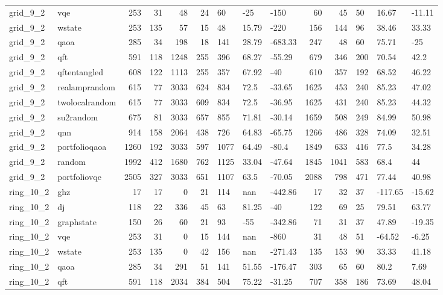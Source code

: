 \begin{longtable}{llrrrrlllrrlll}
grid\_9\_2 & vqe & 253 & 31 & 48 & 24 & 60 & -25 & -150 & 60 & 45 & 50 & 16.67 & -11.11 \\
grid\_9\_2 & wstate & 253 & 135 & 57 & 15 & 48 & 15.79 & -220 & 156 & 144 & 96 & 38.46 & 33.33 \\
grid\_9\_2 & qaoa & 285 & 34 & 198 & 18 & 141 & 28.79 & -683.33 & 247 & 48 & 60 & 75.71 & -25 \\
grid\_9\_2 & qft & 591 & 118 & 1248 & 255 & 396 & 68.27 & -55.29 & 679 & 346 & 200 & 70.54 & 42.2 \\
grid\_9\_2 & qftentangled & 608 & 122 & 1113 & 255 & 357 & 67.92 & -40 & 610 & 357 & 192 & 68.52 & 46.22 \\
grid\_9\_2 & realamprandom & 615 & 77 & 3033 & 624 & 834 & 72.5 & -33.65 & 1625 & 453 & 240 & 85.23 & 47.02 \\
grid\_9\_2 & twolocalrandom & 615 & 77 & 3033 & 609 & 834 & 72.5 & -36.95 & 1625 & 431 & 240 & 85.23 & 44.32 \\
grid\_9\_2 & su2random & 675 & 81 & 3033 & 657 & 855 & 71.81 & -30.14 & 1659 & 508 & 249 & 84.99 & 50.98 \\
grid\_9\_2 & qnn & 914 & 158 & 2064 & 438 & 726 & 64.83 & -65.75 & 1266 & 486 & 328 & 74.09 & 32.51 \\
grid\_9\_2 & portfolioqaoa & 1260 & 192 & 3033 & 597 & 1077 & 64.49 & -80.4 & 1849 & 633 & 416 & 77.5 & 34.28 \\
grid\_9\_2 & random & 1992 & 412 & 1680 & 762 & 1125 & 33.04 & -47.64 & 1845 & 1041 & 583 & 68.4 & 44 \\
grid\_9\_2 & portfoliovqe & 2505 & 327 & 3033 & 651 & 1107 & 63.5 & -70.05 & 2088 & 798 & 471 & 77.44 & 40.98 \\
ring\_10\_2 & ghz & 17 & 17 & 0 & 21 & 114 & nan & -442.86 & 17 & 32 & 37 & -117.65 & -15.62 \\
ring\_10\_2 & dj & 118 & 22 & 336 & 45 & 63 & 81.25 & -40 & 122 & 69 & 25 & 79.51 & 63.77 \\
ring\_10\_2 & graphstate & 150 & 26 & 60 & 21 & 93 & -55 & -342.86 & 71 & 31 & 37 & 47.89 & -19.35 \\
ring\_10\_2 & vqe & 253 & 31 & 0 & 15 & 144 & nan & -860 & 31 & 48 & 51 & -64.52 & -6.25 \\
ring\_10\_2 & wstate & 253 & 135 & 0 & 42 & 156 & nan & -271.43 & 135 & 153 & 90 & 33.33 & 41.18 \\
ring\_10\_2 & qaoa & 285 & 34 & 291 & 51 & 141 & 51.55 & -176.47 & 303 & 65 & 60 & 80.2 & 7.69 \\
ring\_10\_2 & qft & 591 & 118 & 2034 & 384 & 504 & 75.22 & -31.25 & 707 & 358 & 186 & 73.69 & 48.04 \\

\end{longtable}
